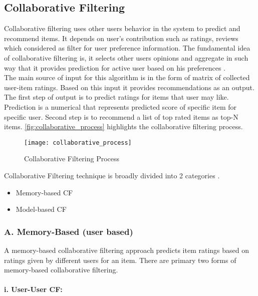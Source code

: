 \subsection{Collaborative Filtering}
Collaborative filtering uses other users behavior in the system to predict and recommend items. It depends on user's contribution such as ratings, reviews which considered as filter for user preference information. The fundamental idea of collaborative filtering is, it selects other users opinions and aggregate in such way that it provides prediction for active user based on his preferences \cite{7}. 
\\The main source of input for this algorithm is in the form of matrix of collected user-item ratings. Based on this input it provides recommendations as an output. The first step of output is to predict ratings for items that user may like. Prediction is a numerical that represents predicted score of specific item for specific user. Second step is to recommend a list of top rated items as top-N items. \autoref{fig:collaborative_process} highlights the collaborative filtering process.
\\

\begin{figure}[H]
	\centering
	\texttt{[image: collaborative\_process]}
	\caption{Collaborative Filtering Process \cite{33}}
	\label{fig:collaborative_process}
\end{figure}


\noindent Collaborative Filtering technique is broadly divided into 2 categories \cite{11}. 
\\
\begin{itemize}
\item Memory-based CF
\item Model-based CF
\end{itemize}

\subsubsection{A. Memory-Based (user based)}
A memory-based collaborative filtering approach predicts item ratings based on ratings given by different users for an item. There are primary two forms of memory-based collaborative filtering.
\paragraph{i. User-User CF:} 

